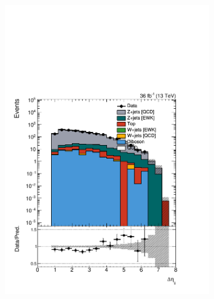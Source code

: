 \begin{figure}[]
    \begin{center}
        \begin{subfigure}[t]{0.24\textwidth}
            \includegraphics[width=\textwidth]{figures/vbf/prefit/dielectron_jot12DEta_logy.pdf}
        \end{subfigure}
        \begin{subfigure}[t]{0.24\textwidth}

\end{subfigure}
\end{center}
\end{figure}
